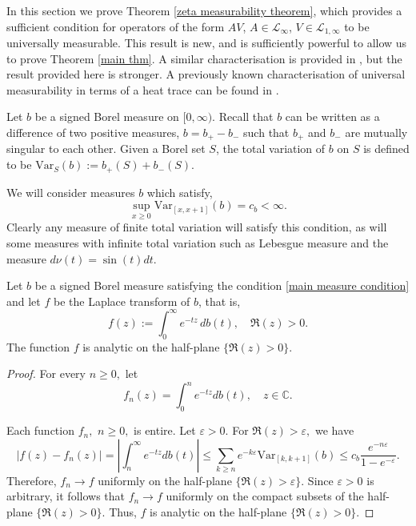     In this section we prove Theorem \ref{zeta measurability theorem}, which provides a sufficient condition for operators of the form $AV$, $A \in \mathcal{L}_\infty$, $V \in \mathcal{L}_{1,\infty}$
    to be universally measurable. This result is new, and is sufficiently powerful to allow us to prove Theorem \ref{main thm}. A similar characterisation is provided in \cite[Theorem 4.13]{SUZ-indiana}, but the
    result provided here is stronger. A previously known characterisation of universal measurability
    in terms of a heat trace can be found in \cite[Proposition 6]{CRSZ}.
    
    Let $b$ be a signed Borel measure on $[0,\infty)$. Recall that $b$ can be written as a difference of two positive measures, $b = b_+-b_-$
    such that $b_+$ and $b_-$ are mutually singular to each other. Given a Borel set $S$, the total variation of $b$ on $S$ is defined to be $\mathrm{Var}_S(b) := b_+(S)+b_-(S)$.
    
    We will consider measures $b$ which satisfy,
    \begin{equation}\label{main measure condition}
        \sup_{x \geq 0} \mathrm{Var}_{[x,x+1]}(b) = c_b < \infty.
    \end{equation}
    Clearly any measure of finite total variation will satisfy this condition, as will some measures with infinite total variation such as Lebesgue measure and the measure $d\nu(t) = \sin(t)dt$.
    
    \begin{lem} 
        Let $b$ be a signed Borel measure satisfying the condition \eqref{main measure condition} and let $f$ be the Laplace transform of $b$, that is,
        \begin{equation*}
            f(z) := \int_0^\infty e^{-tz}\,db(t),\quad \Re(z) > 0.
        \end{equation*}
        The function $f$ is analytic on the half-plane $\{\Re(z)>0\}.$    
    \end{lem}
    \begin{proof} 
        For every $n\geq0,$ let
        $$f_n(z)=\int_0^ne^{-tz}db(t),\quad z\in\mathbb{C}.$$
        
        Each function $f_n,$ $n\geq0,$ is entire. Let $\varepsilon > 0.$ For $\Re(z)>\varepsilon,$ we have
        $$|f(z)-f_n(z)|=|\int_n^{\infty}e^{-tz}db(t)|\leq\sum_{k\geq n}e^{-k\varepsilon}\mathrm{Var}_{[k,k+1]}(b)\leq c_b\frac{e^{-n\varepsilon}}{1-e^{-\varepsilon}}.$$
        Therefore, $f_n\to f$ uniformly on the half-plane $\{\Re(z)>\varepsilon\}.$ Since $\varepsilon>0$ is arbitrary, it follows that $f_n\to f$ uniformly on the compact subsets of the half-plane $\{\Re(z)>0\}.$ Thus, $f$ is analytic on the half-plane $\{\Re(z)>0\}.$
    \end{proof}
    
